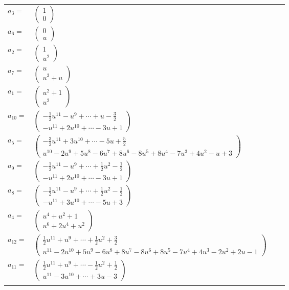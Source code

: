 \documentclass[1p]{elsarticle_modified}
\theoremstyle{definition}
\begin{document}
\begin{tabular}{m{7pt} m{180pt} m{7pt} m{180pt} }
\flushright $a_{3}=$&$\begin{pmatrix}1\\0\end{pmatrix}$ \\
\flushright $a_{6}=$&$\begin{pmatrix}0\\u\end{pmatrix}$ \\
\flushright $a_{2}=$&$\begin{pmatrix}1\\u^2\end{pmatrix}$ \\
\flushright $a_{7}=$&$\begin{pmatrix}u\\u^3+u\end{pmatrix}$ \\
\flushright $a_{1}=$&$\begin{pmatrix}u^2+1\\u^2\end{pmatrix}$ \\
\flushright $a_{10}=$&$\begin{pmatrix}-\frac{1}{2} u^{11}- u^9+\cdots+u-\frac{3}{2}\\- u^{11}+2 u^{10}+\cdots-3 u+1\end{pmatrix}$ \\
\flushright $a_{5}=$&$\begin{pmatrix}-\frac{3}{2} u^{11}+3 u^{10}+\cdots-5 u+\frac{5}{2}\\u^{10}-2 u^9+5 u^8-6 u^7+8 u^6-8 u^5+8 u^4-7 u^3+4 u^2- u+3\end{pmatrix}$ \\
\flushright $a_{9}=$&$\begin{pmatrix}-\frac{1}{2} u^{11}- u^9+\cdots+\frac{1}{2} u^2-\frac{1}{2}\\- u^{11}+2 u^{10}+\cdots-3 u+1\end{pmatrix}$ \\
\flushright $a_{8}=$&$\begin{pmatrix}-\frac{1}{2} u^{11}- u^9+\cdots+\frac{1}{2} u^2-\frac{1}{2}\\- u^{11}+3 u^{10}+\cdots-5 u+3\end{pmatrix}$ \\
\flushright $a_{4}=$&$\begin{pmatrix}u^4+u^2+1\\u^6+2 u^4+u^2\end{pmatrix}$ \\
\flushright $a_{12}=$&$\begin{pmatrix}\frac{1}{2} u^{11}+u^9+\cdots+\frac{1}{2} u^2+\frac{3}{2}\\u^{11}-2 u^{10}+5 u^9-6 u^8+8 u^7-8 u^6+8 u^5-7 u^4+4 u^3-2 u^2+2 u-1\end{pmatrix}$ \\
\flushright $a_{11}=$&$\begin{pmatrix}\frac{1}{2} u^{11}+u^9+\cdots-\frac{1}{2} u^2+\frac{1}{2}\\u^{11}-3 u^{10}+\cdots+3 u-3\end{pmatrix}$\\&\end{tabular}
\end{document}
